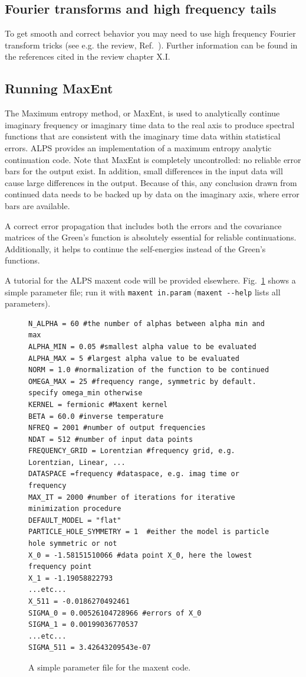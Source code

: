 \documentclass[aps,prb,floatfix,superscriptaddress,twocolumn,notitlepage]{revtex4-1}
\begin{document}
\subsection{Fourier transforms and high frequency tails}
To get smooth and correct behavior you may need to use high frequency Fourier transform tricks (see e.g. the review, Ref.~). Further information can be found in the references cited in the review chapter X.I.

\subsection{Running MaxEnt}
The Maximum entropy method, or MaxEnt, is used to analytically continue imaginary frequency or imaginary time data to the real axis to produce spectral functions that are consistent with the imaginary time data within  statistical errors.\cite{Jarrell96} ALPS provides an implementation of a maximum entropy analytic continuation code. Note that MaxEnt is completely uncontrolled: no reliable error bars for the output exist. In addition, small differences in the input data will cause large differences in the output. Because of this, any conclusion drawn from continued data needs to be backed up by data on the imaginary axis, where error bars are available.

A correct error propagation that includes both the errors and the covariance matrices of the Green's function is absolutely essential for reliable continuations. Additionally, it helps to continue the self-energies instead of the Green's functions\cite{Wang09gap}.

A tutorial for the ALPS maxent code will be provided elsewhere. Fig.~\ref{pfile} shows a simple parameter file; run it with \verb|maxent in.param| (\verb|maxent --help| lists all parameters).

\begin{figure}
\begin{verbatim}
N_ALPHA = 60 #the number of alphas between alpha min and max
ALPHA_MIN = 0.05 #smallest alpha value to be evaluated
ALPHA_MAX = 5 #largest alpha value to be evaluated
NORM = 1.0 #normalization of the function to be continued
OMEGA_MAX = 25 #frequency range, symmetric by default. specify omega_min otherwise
KERNEL = fermionic #Maxent kernel
BETA = 60.0 #inverse temperature
NFREQ = 2001 #number of output frequencies
NDAT = 512 #number of input data points
FREQUENCY_GRID = Lorentzian #frequency grid, e.g. Lorentzian, Linear, ...
DATASPACE =frequency #dataspace, e.g. imag time or frequency
MAX_IT = 2000 #number of iterations for iterative minimization procedure
DEFAULT_MODEL = "flat"
PARTICLE_HOLE_SYMMETRY = 1  #either the model is particle hole symmetric or not
X_0 = -1.58151510066 #data point X_0, here the lowest frequency point
X_1 = -1.19058822793
...etc...
X_511 = -0.0186270492461
SIGMA_0 = 0.00526104728966 #errors of X_0
SIGMA_1 = 0.00199036770537
...etc...
SIGMA_511 = 3.42643209543e-07
\end{verbatim}
\caption{A simple parameter file for the maxent code.\label{pfile}}
\end{figure}
\end{document}
